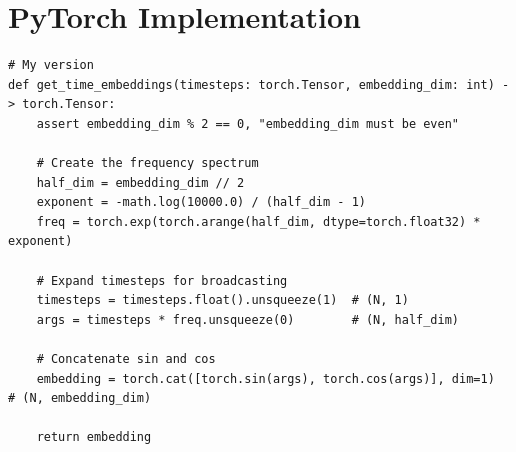 \documentclass{article}
\begin{document}
\section{PyTorch Implementation}

\begin{verbatim}
# My version
def get_time_embeddings(timesteps: torch.Tensor, embedding_dim: int) -> torch.Tensor:
    assert embedding_dim % 2 == 0, "embedding_dim must be even"

    # Create the frequency spectrum
    half_dim = embedding_dim // 2
    exponent = -math.log(10000.0) / (half_dim - 1)
    freq = torch.exp(torch.arange(half_dim, dtype=torch.float32) * exponent)

    # Expand timesteps for broadcasting
    timesteps = timesteps.float().unsqueeze(1)  # (N, 1)
    args = timesteps * freq.unsqueeze(0)        # (N, half_dim)

    # Concatenate sin and cos
    embedding = torch.cat([torch.sin(args), torch.cos(args)], dim=1)  # (N, embedding_dim)

    return embedding
\end{verbatim}
\end{document}
